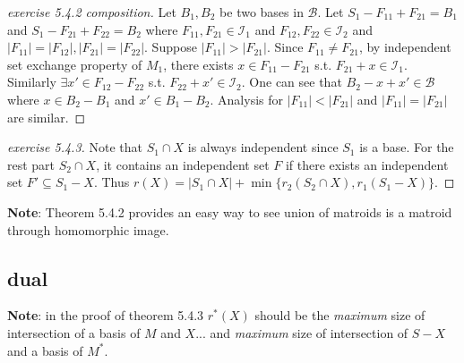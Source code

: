 \documentclass[12pt]{article}
\begin{document}
\begin{proof}[exercise 5.4.2 composition]
    Let $B_1,B_2$ be two bases in $\mathcal B$. Let $S_1-F_{11}+F_{21}=B_1$ and $S_1-F_{21}+F_{22}=B_2$ where $F_{11},F_{21}\in \mathcal{I}_1$ and $F_{12},F_{22}\in \mathcal{I}_2$ and $|F_{11}|=|F_{12}|,|F_{21}|=|F_{22}|$. Suppose $|F_{11}|>|F_{21}|$. Since $F_{11}\not=F_{21}$, by independent set exchange property of $M_1$, there exists $x\in F_{11}-F_{21}$ s.t. $F_{21}+x\in \mathcal{I}_1$. Similarly $\exists x'\in F_{12}-F_{22}$ s.t. $F_{22}+x'\in \mathcal{I}_2$. One can see that $B_2-x+x'\in \mathcal{B}$ where $x\in B_2-B_1$ and $x'\in B_1-B_2$. Analysis for $|F_{11}|<|F_{21}|$ and $|F_{11}|=|F_{21}|$ are similar.
\end{proof}
\begin{proof}[exercise 5.4.3]
    Note that $S_1\cap X$ is always independent since $S_1$ is a base. For the rest part $S_2\cap X$, it contains an independent set $F$ if there exists an independent set $F'\subseteq S_1-X$. Thus $r(X)=|S_1\cap X|+\min\{r_2(S_2\cap X),r_1(S_1-X)\}$.
\end{proof}

\textbf{Note}: Theorem 5.4.2 provides an easy way to see union of matroids is a matroid through homomorphic image.

\subsection{dual}
\textbf{Note}: in the proof of theorem 5.4.3 $r^*(X)$ should be the \emph{maximum} size of intersection of a basis of $M$ and $X$... and \emph{maximum} size of intersection of $S-X$ and a basis of $M^*$.
\end{document}
